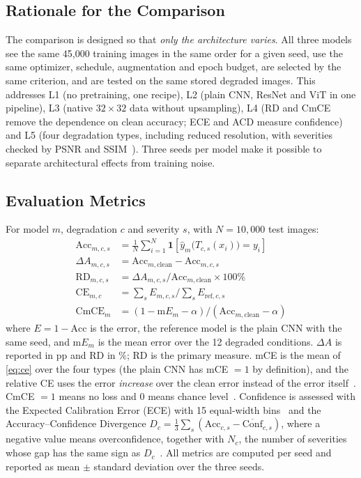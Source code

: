 \documentclass[conference]{IEEEtran}
\begin{document}
\subsection{Rationale for the Comparison}
The comparison is designed so that \emph{only the architecture varies}. All three models see the same 45{,}000 training images in the same order for a given seed, use the same optimizer, schedule, augmentation and epoch budget, are selected by the same criterion, and are tested on the same stored degraded images. This addresses L1 (no pretraining, one recipe), L2 (plain CNN, ResNet and ViT in one pipeline), L3 (native $32\times32$ data without upsampling), L4 (RD and CmCE remove the dependence on clean accuracy; ECE and ACD measure confidence) and L5 (four degradation types, including reduced resolution, with severities checked by PSNR and SSIM~\cite{wang2004}). Three seeds per model make it possible to separate architectural effects from training noise.

\subsection{Evaluation Metrics}
For model $m$, degradation $c$ and severity $s$, with $N = 10{,}000$ test images:
\begin{align}
\mathrm{Acc}_{m,c,s} &= \tfrac{1}{N}\textstyle\sum_{i=1}^{N} \mathbf{1}\!\left[\hat{y}_m\big(T_{c,s}(x_i)\big) = y_i\right] \label{eq:acc}\\
\Delta A_{m,c,s} &= \mathrm{Acc}_{m,\mathrm{clean}} - \mathrm{Acc}_{m,c,s} \label{eq:drop}\\
\mathrm{RD}_{m,c,s} &= \Delta A_{m,c,s} / \mathrm{Acc}_{m,\mathrm{clean}} \times 100\% \label{eq:rd}\\
\mathrm{CE}_{m,c} &= \textstyle\sum_{s} E_{m,c,s} \big/ \sum_{s} E_{\mathrm{ref},c,s} \label{eq:ce}\\
\mathrm{CmCE}_m &= \left(1 - \mathrm{m}E_m - \alpha\right) / \left(\mathrm{Acc}_{m,\mathrm{clean}} - \alpha\right) \label{eq:cmce}
\end{align}
where $E = 1 - \mathrm{Acc}$ is the error, the reference model is the plain CNN with the same seed, and $\mathrm{m}E_m$ is the mean error over the 12 degraded conditions. $\Delta A$ is reported in pp and RD in \%; RD is the primary measure. mCE is the mean of \eqref{eq:ce} over the four types (the plain CNN has mCE $= 1$ by definition), and the relative CE uses the error \emph{increase} over the clean error instead of the error itself~\cite{hendrycks2019}. CmCE $= 1$ means no loss and $0$ means chance level~\cite{liu2024}. Confidence is assessed with the Expected Calibration Error (ECE) with 15 equal-width bins~\cite{guo2017} and the Accuracy--Confidence Divergence $D_c = \frac{1}{3}\sum_s(\mathrm{Acc}_{c,s} - \overline{\mathrm{Conf}}_{c,s})$, where a negative value means overconfidence, together with $N_c$, the number of severities whose gap has the same sign as $D_c$~\cite{erkara2026}. All metrics are computed per seed and reported as mean $\pm$ standard deviation over the three seeds.
\end{document}
